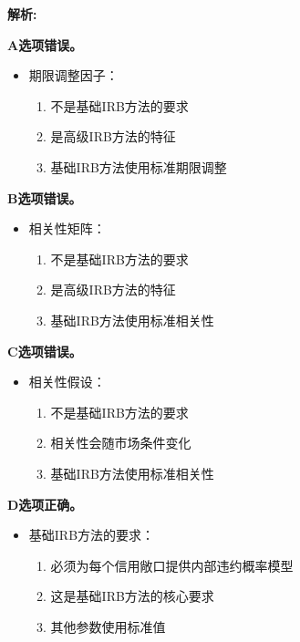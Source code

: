 \documentclass{article}
\newenvironment{explanation}
{\textbf{解析:}\par}
{\par}
\begin{document}
\begin{explanation}
    \textbf{A选项错误。}
    \begin{itemize}
        \item 期限调整因子：
        \begin{enumerate}
            \item 不是基础IRB方法的要求
            \item 是高级IRB方法的特征
            \item 基础IRB方法使用标准期限调整
        \end{enumerate}
    \end{itemize}
    
    \textbf{B选项错误。}
    \begin{itemize}
        \item 相关性矩阵：
        \begin{enumerate}
            \item 不是基础IRB方法的要求
            \item 是高级IRB方法的特征
            \item 基础IRB方法使用标准相关性
        \end{enumerate}
    \end{itemize}
    
    \textbf{C选项错误。}
    \begin{itemize}
        \item 相关性假设：
        \begin{enumerate}
            \item 不是基础IRB方法的要求
            \item 相关性会随市场条件变化
            \item 基础IRB方法使用标准相关性
        \end{enumerate}
    \end{itemize}
    
    \textbf{D选项正确。}
    \begin{itemize}
        \item 基础IRB方法的要求：
        \begin{enumerate}
            \item 必须为每个信用敞口提供内部违约概率模型
            \item 这是基础IRB方法的核心要求
            \item 其他参数使用标准值
        \end{enumerate}
    \end{itemize}
\end{explanation}
\end{document}
